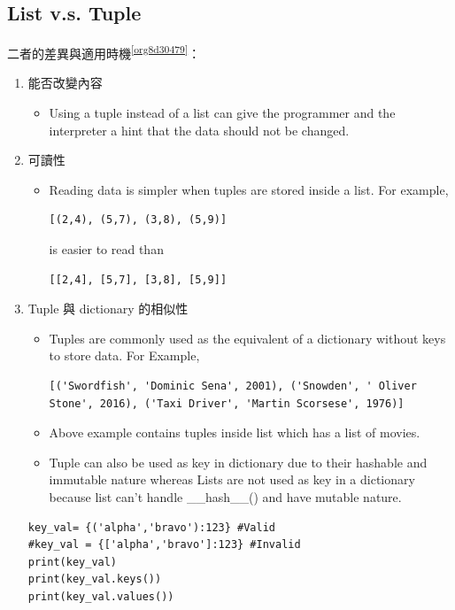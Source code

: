 \documentclass[a4paper,12pt]{article}
\begin{document}
\subsection{List v.s. Tuple}
\label{sec:org31e6ff6}
二者的差異與適用時機\textsuperscript{\ref{org8d30479}}：\\
\begin{enumerate}
\item 能否改變內容
\label{sec:org57e4729}
\begin{itemize}
\item Using a tuple instead of a list can give the programmer and the interpreter a hint that the data should not be changed.\\
\end{itemize}
\item 可讀性
\label{sec:orgb67f02e}
\begin{itemize}
\item Reading data is simpler when tuples are stored inside a list. For example,\\
\lstset{breaklines=true,language=Python,label= ,caption= ,captionpos=b,firstnumber=1,numbers=left}
\begin{lstlisting}
[(2,4), (5,7), (3,8), (5,9)]
\end{lstlisting}
is easier to read than\\
\lstset{breaklines=true,language=Python,label= ,caption= ,captionpos=b,firstnumber=1,numbers=left}
\begin{lstlisting}
[[2,4], [5,7], [3,8], [5,9]]
\end{lstlisting}
\end{itemize}

\item Tuple 與 dictionary 的相似性
\label{sec:org9561206}
\begin{itemize}
\item Tuples are commonly used as the equivalent of a dictionary without keys to store data. For Example,\\
\lstset{breaklines=true,language=Python,label= ,caption= ,captionpos=b,firstnumber=1,numbers=left}
\begin{lstlisting}
[('Swordfish', 'Dominic Sena', 2001), ('Snowden', ' Oliver Stone', 2016), ('Taxi Driver', 'Martin Scorsese', 1976)]
\end{lstlisting}
\item Above example contains tuples inside list which has a list of movies.\\
\item Tuple can also be used as key in dictionary due to their hashable and immutable nature whereas Lists are not used as key in a dictionary because list can't handle \_\_hash\_\_() and have mutable nature.\\
\end{itemize}
\lstset{breaklines=true,language=Python,label= ,caption= ,captionpos=b,firstnumber=1,numbers=left}
\begin{lstlisting}
key_val= {('alpha','bravo'):123} #Valid
#key_val = {['alpha','bravo']:123} #Invalid
print(key_val)
print(key_val.keys())
print(key_val.values())
\end{lstlisting}


\end{enumerate}
\end{document}
